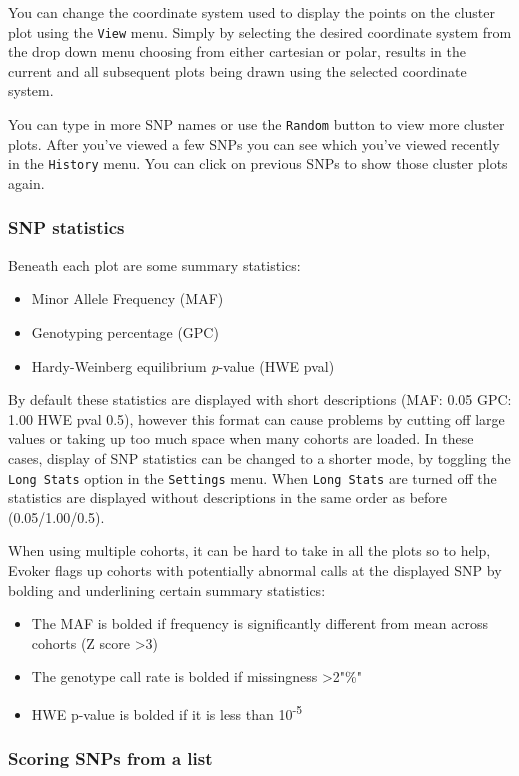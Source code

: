 \documentclass{article}
\begin{document}
You can change the coordinate system used to display the points on the cluster plot using the \texttt{View} menu. Simply by selecting the desired coordinate system from the drop down menu choosing from either cartesian or polar, results in the current and all subsequent plots being drawn using the selected coordinate system. 

You can type in more SNP names or use the \texttt{Random} button to view more cluster plots. After you've viewed a few SNPs you can see which you've viewed recently in the \texttt{History} menu. You can click on previous SNPs to show those cluster plots again.

\subsubsection{SNP statistics}
Beneath each plot are some summary statistics: 
\begin{itemize}
\item{Minor Allele Frequency (MAF)}
\item{Genotyping percentage (GPC)}
\item{Hardy-Weinberg equilibrium \emph{p}-value (HWE pval)}
\end{itemize}
By default these statistics are displayed with short descriptions (MAF: 0.05 GPC: 1.00 HWE pval 0.5), however this format can cause problems by cutting off large values or taking up too much space when many cohorts are loaded. In these cases, display of SNP statistics can be changed to a shorter mode, by toggling the \texttt{Long Stats} option in the \texttt{Settings} menu. When \texttt{Long Stats} are turned off the statistics are displayed without descriptions in the same order as before (0.05/1.00/0.5).

When using multiple cohorts, it can be hard to take in all the plots so to help, Evoker flags up cohorts with potentially abnormal calls at the displayed SNP by bolding and underlining certain summary statistics:
\begin{itemize}
	\item{The MAF is bolded if frequency is significantly different from mean across cohorts (Z score \textgreater 3)}
	\item{The genotype call rate is bolded if missingness \textgreater 2"\%"}
	\item{HWE p-value is bolded if it is less than 10\textsuperscript{-5}}
\end{itemize}

\subsubsection{Scoring SNPs from a list}
\end{document}
